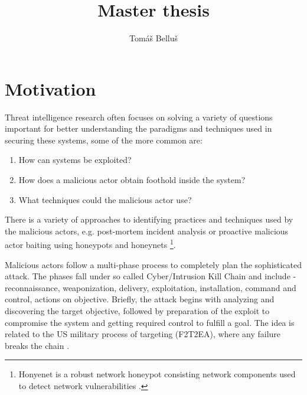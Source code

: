\documentclass[12pt,a4paper,twoside]{report}
\title{Master thesis}
\author{Tomáš Belluš}
\begin{document}
	


\thispagestyle{empty}

% 

\newpage{}\thispagestyle{empty}

\newpage
\thispagestyle{empty}
\mbox{}
\newpage

\begingroup
\color{black}
\tableofcontents
\endgroup


\chapter{Motivation}\label{motivation}

Threat intelligence research often focuses on solving a variety of questions important for better understanding the paradigms and techniques used in securing these systems, some of the more common are:
\begin{enumerate}
	\item How can systems be exploited?
	\item How does a malicious actor obtain foothold inside the system?
	\item What techniques could the malicious actor use?
\end{enumerate}

There is a variety of approaches to identifying practices and techniques used by the malicious actors, e.g. post-mortem incident analysis \cite{research:blog:post-mortem} or proactive malicious actor baiting using honeypots and honeynets \footnote{Honyenet is a robust network honeypot consisting network components used to detect network vulnerabilities \cite{research:web:honeynet}.}.


 
Malicious actors follow a multi-phase process \cite{research:seven-phases} \cite{research:seven-phases2} to completely plan the sophisticated attack. The phases fall under so called Cyber/Intrusion Kill Chain and include - reconnaissance, weaponization, delivery, exploitation, installation, command and control, actions on objective. Briefly, the attack begins with analyzing and discovering the target objective, followed by preparation of the exploit to compromise the system and getting required control to fulfill a goal. The idea is related to the US military process of targeting (F2T2EA), where any failure breaks the chain \cite{research:paper:kill-chain}. 
\end{document}
